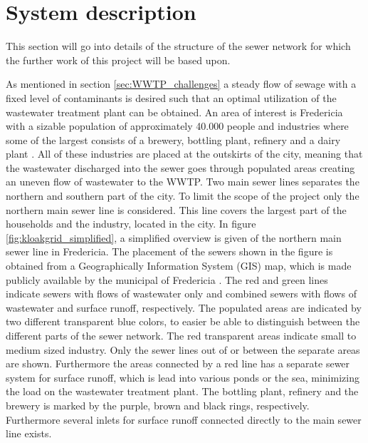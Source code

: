 \chapter{System description}\label{se:system_description}
This section will go into details of the structure of the sewer network for which the further work of this project will be based upon.

As mentioned in section \ref{sec:WWTP_challenges} a steady flow of sewage with a fixed level of contaminants is desired such that an optimal utilization of the wastewater treatment plant can be obtained. An area of interest is Fredericia with a sizable population of approximately 40.000 people and industries where some of the largest consists of a brewery, bottling plant, refinery and a dairy plant \cite{Statistic_Denmark}. All of these industries are placed at the outskirts of the city, meaning that the wastewater discharged into the sewer goes through populated areas creating an uneven flow of wastewater to the WWTP. Two main sewer lines separates the northern and southern part of the city. To limit the scope of the project only the northern main sewer line is considered. This line covers the largest part of the households and the industry, located in the city. %
In figure \ref{fig:kloakgrid_simplified}, a simplified overview is given of the northern main sewer line in Fredericia. The placement of the sewers shown in the figure is obtained from a Geographically Information System (GIS) map, which is made publicly available by the municipal of Fredericia \cite{GIS_kort}. The red and green lines indicate sewers with flows of wastewater only and combined sewers with flows of wastewater and surface runoff, respectively. The populated areas are indicated by two different transparent blue colors, to easier be able to distinguish between the different parts of the sewer network. The red transparent areas indicate small to medium sized industry. 
Only the sewer lines out of or between the separate areas are shown. Furthermore the areas connected by a red line has a separate sewer system for surface runoff, which is lead into various ponds or the sea, minimizing the load on the wastewater treatment plant.
The bottling plant, refinery and the brewery is marked by the purple, brown and black rings, respectively. Furthermore several inlets for surface runoff connected directly to the main sewer line exists. %


